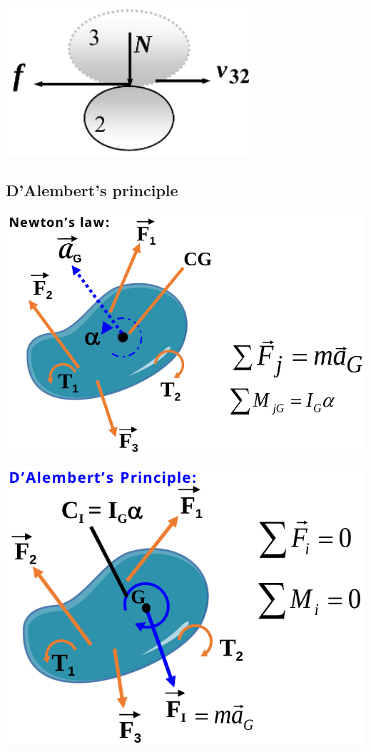 \documentclass[11pt]{article}
\begin{document}
\begin{center}
\includegraphics[height=15em]{./images/coulomb-friction-diagram.png}
\end{center}

 \newpage
\subsection{D'Alembert's principle}
\label{sec:orgf2a61c0}

\begin{center}
\includegraphics[width=.9\linewidth]{./images/newtons-law-diagram.png}
\end{center}
\begin{center}
\includegraphics[width=.9\linewidth]{./images/d-alemberts-principle-diagram.png}
\end{center}
\end{document}
